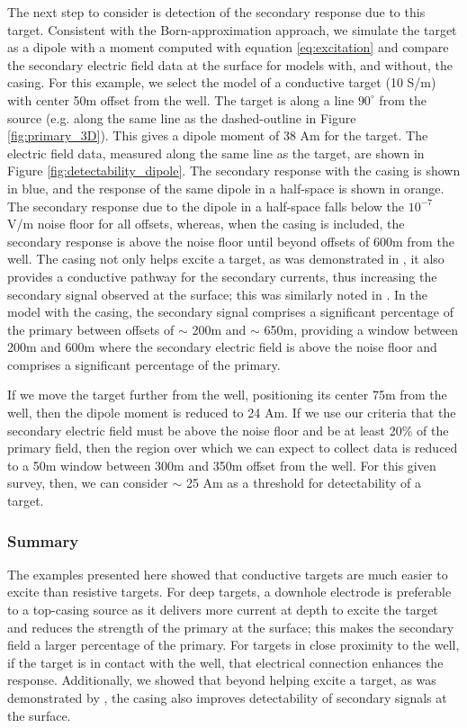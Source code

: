 The next step to consider is detection of the secondary response due to this target. Consistent with the Born-approximation approach, we simulate the target as a dipole with a moment computed with equation \ref{eq:excitation} and compare the secondary electric field data at the surface for models with, and without, the casing. For this example, we select the model of a conductive target (10 S/m) with center 50m offset from the well. The target is along a line $90^\circ$ from the source (e.g. along the same line as the dashed-outline in Figure \ref{fig:primary_3D}). This gives a dipole moment of 38 Am for the target. The electric field data, measured along the same line as the target, are shown in Figure \ref{fig:detectability_dipole}. The secondary response with the casing is shown in blue, and the response of the same dipole in a half-space is shown in orange. The secondary response due to the dipole in a half-space falls below the $10^{-7}$ V/m noise floor for all offsets, whereas, when the casing is included, the secondary response is above the noise floor until beyond offsets of 600m from the well. The casing not only helps excite a target, as was demonstrated in \cite{Schenkel1994}, it also provides a conductive pathway for the secondary currents, thus increasing the secondary signal observed at the surface; this was similarly noted in \cite{Yang2016}. In the model with the casing, the secondary signal comprises a significant percentage of the primary between offsets of $\sim$ 200m and $\sim$ 650m, providing a window between 200m and 600m where the secondary electric field is above the noise floor and comprises a significant percentage of the primary.

If we move the target further from the well, positioning its center 75m from the well, then the dipole moment is reduced to 24 Am. If we use our criteria that the secondary electric field must be above the noise floor and be at least 20\%  of the primary field, then  the region over which we can expect to collect data is reduced to a 50m window between 300m and 350m offset from the well. For this given survey, then, we can consider $\sim$ 25 Am as a threshold for detectability of a target.





\subsubsection{Summary}
The examples presented here showed that conductive targets are much easier to excite than resistive targets. For deep targets, a downhole electrode is preferable to a top-casing source as it delivers more current at depth to excite the target and reduces the strength of the primary at the surface; this makes the secondary field a larger percentage of the primary. For targets in close proximity to the well, if the target is in contact with the well, that electrical connection enhances the response. Additionally, we showed that beyond helping excite a target, as was demonstrated by \cite{Schenkel1994}, the casing also improves detectability of secondary signals at the surface.

